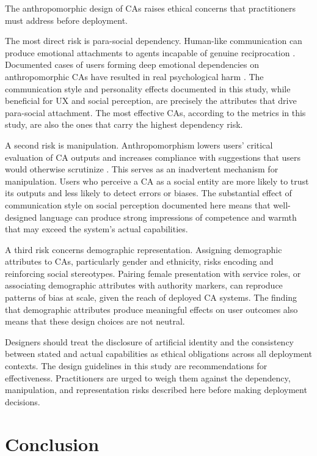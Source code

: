 \documentclass[preprint,review,12pt,authoryear,nonatbib]{elsarticle}
\begin{document}
The anthropomorphic design of CAs raises ethical concerns that practitioners must address before deployment.

The most direct risk is para-social dependency. Human-like communication can produce emotional attachments to agents incapable of genuine reciprocation \parencite{chaves2021should}. %
Documented cases of users forming deep emotional dependencies on anthropomorphic CAs have resulted in real psychological harm \parencite{laura_kuenssberg_mothers_2025}. The communication style and personality effects documented in this study, while beneficial for UX and social perception, are precisely the attributes that drive para-social attachment. The most effective CAs, according to the metrics in this study, are also the ones that carry the highest dependency risk.

A second risk is manipulation. Anthropomorphism lowers users' critical evaluation of CA outputs and increases compliance with suggestions that users would otherwise scrutinize \parencite{chaves2021should}. This serves as an inadvertent mechanism for manipulation. Users who perceive a CA as a social entity are more likely to trust its outputs and less likely to detect errors or biases. The substantial effect of communication style on social perception documented here means that well-designed language can produce strong impressions of competence and warmth that may exceed the system's actual capabilities.

A third risk concerns demographic representation. Assigning demographic attributes to CAs, particularly gender and ethnicity, risks encoding and reinforcing social stereotypes. Pairing female presentation with service roles, or associating demographic attributes with authority markers, can reproduce patterns of bias at scale, given the reach of deployed CA systems. The finding that demographic attributes produce meaningful effects on user outcomes also means that these design choices are not neutral.

Designers should treat the disclosure of artificial identity and the consistency between stated and actual capabilities as ethical obligations across all deployment contexts. The design guidelines in this study are recommendations for effectiveness. Practitioners are urged to weigh them against the dependency, manipulation, and representation 
risks described here before making deployment decisions.


\section{Conclusion}
\end{document}
